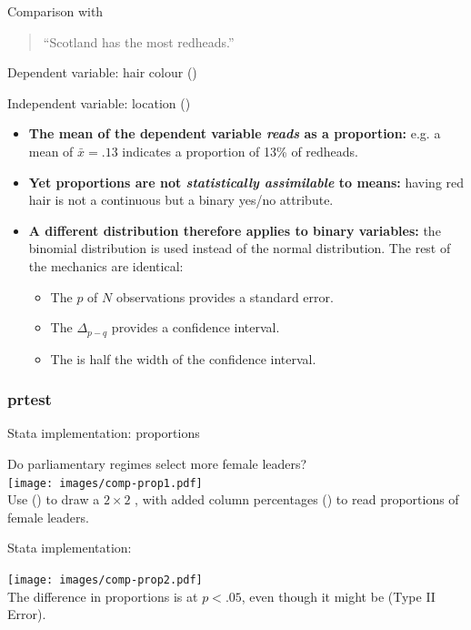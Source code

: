 \documentclass{beamer}
\begin{document}
	\begin{frame}[t]{Comparison with }
					
		\begin{quote}
		``Scotland has the most redheads.''
		\end{quote}
		
		Dependent variable:  hair colour ()

		Independent variable:  location ()

		\begin{itemize}
			\item \textbf{The mean of the dependent variable \textit{reads} as a proportion:} e.g. a mean of $\bar x=.13$ indicates a proportion of 13\% of redheads.

			\item \textbf{Yet proportions are not \textit{statistically assimilable} to means:} having red hair is not a continuous but a binary yes/no attribute.
			
			\item \textbf{A different distribution therefore applies to binary variables:} the binomial distribution is used instead of the normal distribution. The rest of the mechanics are identical:
						
				\begin{itemize}
					\item The  $p$ of $N$ observations provides a standard error.
					\item The  $\Delta_{p-q}$ provides a confidence interval.
					\item The  is half the width of the confidence interval.
				\end{itemize}
		\end{itemize}

	\end{frame}	
	
	\subsubsection{prtest}

	\begin{frame}[t]{Stata implementation: proportions}

	Do parliamentary regimes select more female leaders?\\[1em]
	
	\texttt{[image: images/comp-prop1.pdf]}\\[1em]
	
	Use  () to draw a $2 \times 2$ , with added column percentages () to read proportions of female leaders.
	\end{frame}

	\begin{frame}[t]{Stata implementation: }
	
	\texttt{[image: images/comp-prop2.pdf]}\\[0em]
	
	The difference in proportions is  at $p < .05$, even though it might be  (Type II Error).
	\end{frame}
\end{document}
